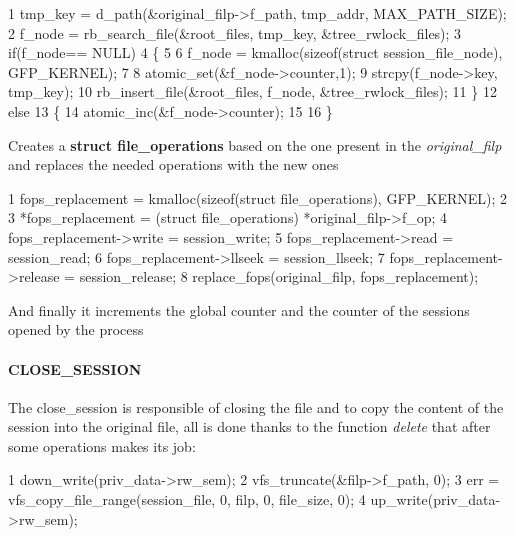 \begin{DoxyCode}
1 tmp\_key = d\_path(&original\_filp->f\_path, tmp\_addr, MAX\_PATH\_SIZE);
2             f\_node = rb\_search\_file(&root\_files, tmp\_key, &tree\_rwlock\_files);
3             if(f\_node== NULL)
4                 \{
5 
6                 f\_node = kmalloc(sizeof(struct session\_file\_node), GFP\_KERNEL);
7 
8                 atomic\_set(&f\_node->counter,1);
9                 strcpy(f\_node->key, tmp\_key);
10                 rb\_insert\_file(&root\_files, f\_node, &tree\_rwlock\_files);
11             \}
12             else
13             \{
14                 atomic\_inc(&f\_node->counter);
15 
16             \}
\end{DoxyCode}



\begin{DoxyItemize}
\item Creates a {\bfseries struct file\+\_\+operations} based on the one present in the {\itshape original\+\_\+filp} and replaces the needed operations with the new ones
\end{DoxyItemize}


\begin{DoxyCode}
1 fops\_replacement = kmalloc(sizeof(struct file\_operations), GFP\_KERNEL);
2 
3             *fops\_replacement = (struct file\_operations) *original\_filp->f\_op;
4             fops\_replacement->write = session\_write;
5             fops\_replacement->read = session\_read;
6             fops\_replacement->llseek = session\_llseek;
7             fops\_replacement->release = session\_release;  
8             replace\_fops(original\_filp, fops\_replacement);
\end{DoxyCode}


And finally it increments the global counter and the counter of the sessions opened by the process

\paragraph*{C\+L\+O\+S\+E\+\_\+\+S\+E\+S\+S\+I\+ON}

The close\+\_\+session is responsible of closing the file and to copy the content of the session into the original file, all is done thanks to the function {\itshape delete} that after some operations makes its job\+: 
\begin{DoxyCode}
1 down\_write(priv\_data->rw\_sem);
2 vfs\_truncate(&filp->f\_path, 0);
3 err = vfs\_copy\_file\_range(session\_file, 0, filp, 0, file\_size, 0); 
4 up\_write(priv\_data->rw\_sem);
\end{DoxyCode}



